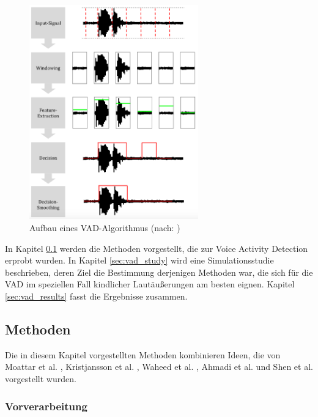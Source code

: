 \begin{figure}[h]
	\centering
	\includegraphics[width=0.65\textwidth]{bilder/vad_pipeline03.png}
	\caption[Aufbau eines VAD-Algorithmus]{Aufbau eines VAD-Algorithmus (nach: \cite[S. 8]{vad_granada})}
	\label{img:vad_pipeline}
\end{figure}


In Kapitel \ref{sec:methods_vad_new} werden die Methoden vorgestellt, die zur Voice Activity Detection erprobt wurden. In Kapitel \ref{sec:vad_study} wird eine Simulationsstudie beschrieben, deren Ziel die Bestimmung derjenigen Methoden war, die sich für die VAD im speziellen Fall kindlicher Lautäußerungen am besten eignen. Kapitel \ref{sec:vad_results} fasst die Ergebnisse zusammen.

\subsection{Methoden}
\label{sec:methods_vad_new}

Die in diesem Kapitel vorgestellten Methoden kombinieren Ideen, die von Moattar et al. \cite{vad_Easy}, Kristjansson et al. \cite{vad_Lisboa}, Waheed et al. \cite{vad_entropy}, Ahmadi et al. \cite{vad_ceps} und Shen et al.\cite{vad_entropie02} vorgestellt wurden.

\subsubsection{Vorverarbeitung}
\label{sec:preprocessing}

